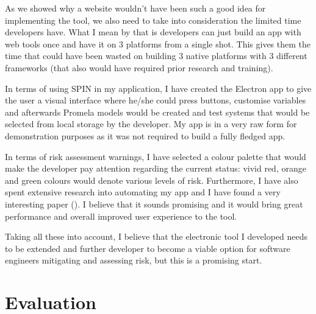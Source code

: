\documentclass[paper=a4, fontsize=11pt]{scrartcl} %
\numberwithin{equation}{section} %
\numberwithin{figure}{section} %
\numberwithin{table}{section} %
\begin{document}
\par
As we showed why a website wouldn't have been such a good idea for implementing the tool, we also need to take into consideration the limited time developers have. What I mean by that is developers can just build an app with web tools once and have it on 3 platforms from a single shot. This gives them the time that could have been wasted on building 3 native platforms with 3 different frameworks (that also would have required prior research and training).\\

\par
In terms of using SPIN in my application, I have created the Electron app to give the user a visual interface where he/she could press buttons, customise variables and afterwards Promela models would be created and test systems that would be selected from local storage by the developer. My app is in a very raw form for demonstration purposes as it was not required to build a fully fledged app. \\

\par 
In terms of risk assessment warnings, I have selected a colour palette that would make the developer pay attention regarding the current status: vivid red, orange and green colours would denote various levels of risk. Furthermore, I have also spent extensive research into automating my app and I have found a very interesting paper (\cite{spin-uml}). I believe that it sounds promising and it would bring great performance and overall improved user experience to the tool. \\

\par 
Taking all these into account, I believe that the electronic tool I developed needs to be extended and further developer to become a viable option for software engineers mitigating and assessing risk, but this is a promising start. 




\section{Evaluation}
\end{document}
